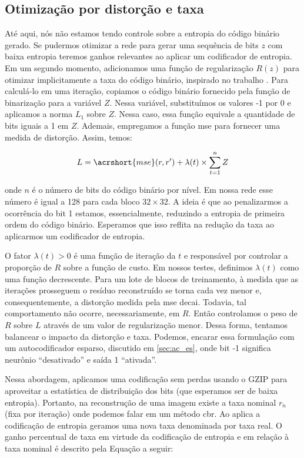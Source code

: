 \subsection{Otimização por distorção e taxa}

Até aqui, nós não estamos tendo controle sobre a entropia do código binário gerado. Se pudermos otimizar a rede para gerar uma sequência de bits $z$ com baixa entropia teremos ganhos relevantes ao aplicar um codificador de entropia. Em um segundo momento, adicionamos uma função de regularização $R(z)$ para otimizar implicitamente a taxa do código binário, inspirado no trabalho \cite{zhao1901cae}. 
Para calculá-lo em uma iteração, copiamos o código binário fornecido pela função de binarização  para a variável $Z$. Nessa variável, substituímos os valores -1 por 0 e aplicamos a norma $L_1$ sobre $Z$. Nessa caso, essa função equivale a quantidade de bits iguais a 1 em $Z$.    
Ademais, empregamos a função \acrshort{mse} para fornecer uma medida de distorção. Assim, temos:

\begin{equation}
\label{eq:rdo}
L = \acrshort{mse}(r,r') + \lambda(t) \times \sum_{t=1}^{n} Z 
\end{equation}

\noindent onde $n$ é o número de bits do código binário por nível. Em nossa rede esse número é igual a 128 para cada bloco $32 \times 32$. A ideia é que ao penalizarmos a ocorrência do bit 1 estamos, essencialmente, reduzindo a entropia de primeira ordem do código binário. Esperamos que isso reflita na redução da taxa ao aplicarmos um codificador de entropia.   

O fator $\lambda(t)>0$ é uma função de iteração da $t$ e responsável por controlar a proporção de $R$ sobre a função de custo. Em nossos testes, definimos $\lambda(t)$ como uma função decrescente. Para um lote de blocos de treinamento, à medida que as iterações prosseguem o resíduo reconstruído se torna cada vez menor e, consequentemente, a distorção medida pela \acrshort{mse} decai. Todavia, tal comportamento não ocorre, necessariamente, em $R$. Então controlamos o peso de $R$ sobre  $L$ através de um valor de regularização menor. Dessa forma, tentamos balancear o impacto da distorção e taxa. Podemos, encarar essa formulação com um autocodificador esparso, discutido em \ref{sec:ac_es}, onde bit -1 significa neurônio ``desativado'' e saída 1 ``ativada''. 

Nessa abordagem, aplicamos uma codificação sem perdas usando o GZIP \cite{sayood2017introduction} para aproveitar a estatística de distribuição dos bits (que esperamos ser de baixa entropia). Portanto, na reconstrução de uma imagem existe a taxa nominal $r_n$ (fixa por iteração) onde podemos falar em um método \gls{cbr}. Ao aplica a codificação de entropia geramos uma nova taxa denominada por taxa real.  O ganho percentual de taxa em virtude da codificação de entropia e em relação à taxa nominal é descrito pela Equação a seguir:

